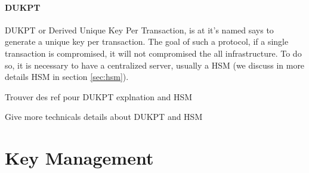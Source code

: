 \documentclass[10pt,a4paper]{article}
\begin{document}
\paragraph{DUKPT}

DUKPT or Derived Unique Key Per Transaction, is at it's named
says to generate a unique key per transaction.
The goal of such a protocol, if a single transaction is compromised,
it will not compromised the all infrastructure.
To do so, it is necessary to have a centralized server, usually
a HSM (we discuss in more details HSM in section \ref{sec:hsm}).


Trouver des ref pour DUKPT explnation and HSM

Give more technicals details about DUKPT and HSM
\section{Key Management}

\label{sec:hsù}




\end{document}
